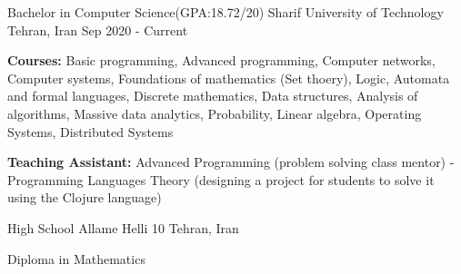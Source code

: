 

\begin{cventries}

  \cventry
  {Bachelor in Computer Science(GPA:18.72/20)} %
  {Sharif University of Technology} %
  {Tehran, Iran} %
  {Sep 2020 - Current} %
  {
    \begin{cvitems} %
      \item {\textbf{Courses:} Basic programming, Advanced programming,
         Computer networks, Computer systems,
           Foundations of mathematics (Set thoery), Logic, Automata and formal
           languages, Discrete mathematics, Data structures, Analysis of
           algorithms,  Massive data analytics, Probability, Linear algebra,
           Operating Systems, Distributed Systems}
      \item {\textbf{Teaching Assistant:} Advanced Programming (problem solving class mentor) - Programming Languages Theory (designing a project for students to solve it using the Clojure language)}
    \end{cvitems}
  }

  \cventry
  {High School} %
  {Allame Helli 10} %
  {Tehran, Iran} %
  {}
  {
    \begin{cvitems} %
    \item {Diploma in Mathematics}
    \end{cvitems}
  }
\end{cventries}
